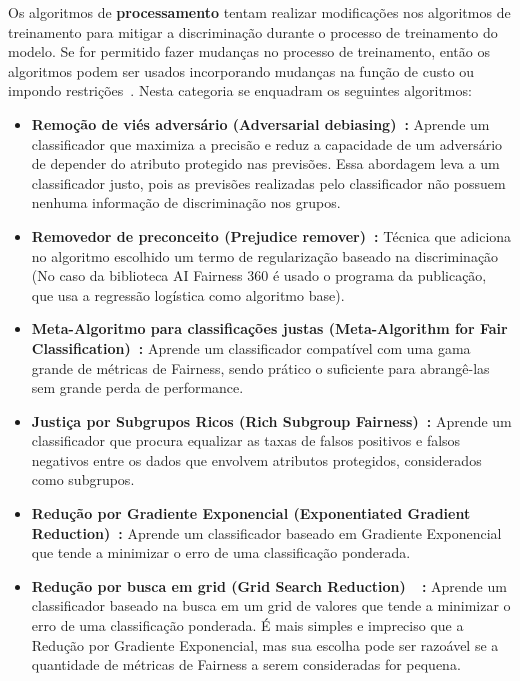 \documentclass[portugues]{ic-tese}
\begin{document}
Os algoritmos de \textbf{processamento} tentam realizar modificações nos algoritmos de treinamento para mitigar a discriminação durante o processo de treinamento do modelo. Se for permitido fazer mudanças no processo de treinamento, então os algoritmos podem ser usados incorporando mudanças na função de custo ou impondo restrições~\citep{Mehrabi_2019}. Nesta categoria se enquadram os seguintes algoritmos:

\begin{itemize}
\item \textbf{Remoção de viés adversário (Adversarial debiasing)~\citep{Zhang_2018}:} Aprende um classificador que maximiza a precisão e reduz a capacidade de um adversário de depender do atributo protegido nas previsões. Essa abordagem leva a um classificador justo, pois as previsões realizadas pelo classificador não possuem nenhuma informação de discriminação nos grupos.

\item \textbf{Removedor de preconceito (Prejudice remover)~\citep{Feldman_2015}:} Técnica que adiciona no algoritmo escolhido um termo de regularização baseado na discriminação (No caso da biblioteca AI Fairness 360 é usado o programa da publicação, que usa a regressão logística como algoritmo base).

\item \textbf{Meta-Algoritmo para classificações justas (Meta-Algorithm for Fair Classification)~\citep{Celis_2019}:} Aprende um classificador compatível com uma gama grande de métricas de Fairness, sendo prático o suficiente para abrangê-las sem grande perda de performance.

\item \textbf{Justiça por Subgrupos Ricos (Rich Subgroup Fairness)~\citep{Kearns_2018}:} Aprende um classificador que procura equalizar as taxas de falsos positivos e falsos negativos entre os dados que envolvem atributos protegidos, considerados como subgrupos.

\item \textbf{Redução por Gradiente Exponencial (Exponentiated Gradient Reduction)~\citep{Agarwal_2018}:} Aprende um classificador baseado em Gradiente Exponencial que tende a minimizar o erro de uma classificação ponderada.

\item \textbf{Redução por busca em grid (Grid Search Reduction)~\citep{Agarwal_2018}~\citep{Agarwal_2019}:} Aprende um classificador baseado na busca em um grid de valores que tende a minimizar o erro de uma classificação ponderada. É mais simples e impreciso que a Redução por Gradiente Exponencial, mas sua escolha pode ser razoável se a quantidade de métricas de Fairness a serem consideradas for pequena.

\end{itemize}
\end{document}
